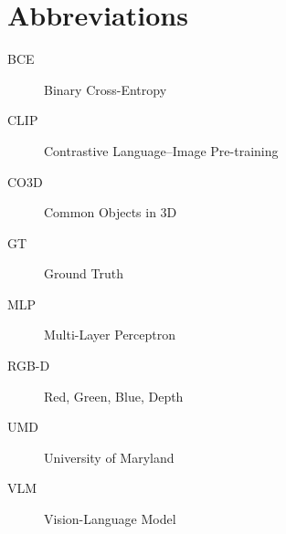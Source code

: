 \chapter*{Abbreviations}\label{abbr}
\begin{description}
\item[BCE] Binary Cross-Entropy
\item[CLIP] Contrastive Language--Image Pre-training
\item[CO3D] Common Objects in 3D
\item[GT] Ground Truth
\item[MLP] Multi-Layer Perceptron
\item[RGB-D] Red, Green, Blue, Depth
\item[UMD] University of Maryland
\item[VLM] Vision-Language Model
\end{description}
